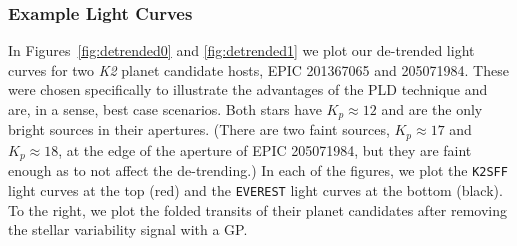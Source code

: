 \documentclass[]{emulateapj}
\begin{document}
\pagebreak

\subsubsection{Example Light Curves}
\begin{figure*}[t]
  \begin{center}
    \leavevmode
       \caption{De-trended light curves for the campaign 1 star EPIC 201367065 \citep[K2-3,][]{CRO15}. \emph{Top}: The de-trended
                \texttt{K2SFF} flux (left) and the GP-smoothed flux folded on the periods of 
                the planets b, c, and d (right). \emph{Bottom}: The de-trended \texttt{EVEREST}
                flux. The 6-hr CDPP is 30.9 ppm for \texttt{K2SFF} and 16.6 ppm for
                \texttt{EVEREST}, a factor of $\sim$ 2 improvement.}
     \label{fig:detrended0}
  \end{center}
\end{figure*}
\begin{figure*}[t]
  \begin{center}
    \leavevmode
       \caption{De-trended light curves for EPIC 205071984, a campaign 2 star with three
                known planet candidates \citep{SIN15}. As in Figure~\ref{fig:detrended0}, the
                \texttt{K2SFF} light curve and the folded transits of EPIC 205071984.01 (b),
                205071984.02 (c), and 205071984.03 (d)
                are shown at the top; the equivalent plots for \texttt{EVEREST} are shown
                at the bottom. The 6-hr CDPP is 56.1 ppm for \texttt{K2SFF} and 24.0 ppm for
                \texttt{EVEREST}, a factor of $\gtrsim$ 2 improvement.}
     \label{fig:detrended1}
  \end{center}
\end{figure*}
In Figures~\ref{fig:detrended0} and \ref{fig:detrended1} we plot our de-trended light curves
for two \emph{K2} planet candidate hosts, EPIC 201367065 and 205071984. These were chosen
specifically to illustrate the advantages of the PLD technique and are, in a sense, best
case scenarios. Both stars have $K_p \approx 12$ and are the only bright sources in their
apertures. (There are two faint sources, $K_p \approx 17$ and $K_p \approx 18$, 
at the edge of the aperture of EPIC 205071984, but they are faint enough as to not affect
the de-trending.) In each of the figures, we plot the \texttt{K2SFF} light curves at the top (red)
and the \texttt{EVEREST} light curves at the bottom (black). To the right, we plot the folded
transits of their planet candidates after removing the stellar variability signal with a GP.
\end{document}
